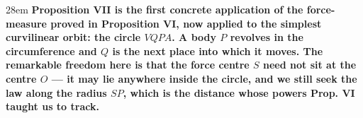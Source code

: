 \documentclass[border=4pt]{standalone}
\begin{document}
\begin{varwidth}{28em}
\large\bfseries
Proposition VII is the first concrete application of the force-measure proved in \textcolor{radgreen}{Proposition VI},      now applied to the simplest curvilinear orbit: the \textcolor{circblue}{circle $VQPA$}.      A body $P$ revolves in the circumference and $Q$ is the next place into which it moves.      The remarkable freedom here is that the \textcolor{centerorange}{force centre $S$} need not sit at the centre $O$ —      it may lie anywhere inside the circle, and we still seek the law along the \textcolor{radgreen}{radius $SP$},      which is the distance whose powers Prop. VI taught us to track.
\end{varwidth}
\end{document}
